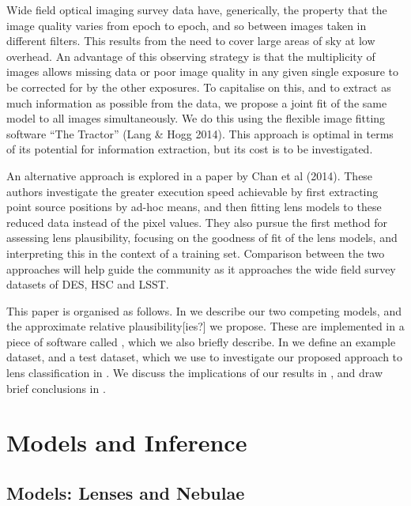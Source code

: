 \documentclass[useAMS,usenatbib]{mn2e}
\begin{document}
Wide field optical imaging survey data have, generically, the  property
that the image quality varies from epoch to epoch, and so between images
taken in different filters. This results from the need to cover large areas
of sky at low overhead. An advantage of this observing strategy is that the
multiplicity of images allows missing data or poor image quality in any
given single exposure to be corrected for by the other exposures. To
capitalise on this, and to extract as much information as possible from the
data, we propose a joint fit of the same model to all images
simultaneously. We do this using the flexible image fitting software ``The
Tractor'' (Lang \& Hogg 2014). This approach is optimal in terms of its
potential for information extraction, but its cost is to be investigated.

An alternative approach is explored in a paper by Chan et al (2014). These
authors investigate the greater execution speed achievable by first
extracting point source positions by ad-hoc means, and then fitting lens
models to these reduced data instead of the pixel values. They also pursue
the first method for assessing lens plausibility, focusing on the goodness
of fit of the lens models, and interpreting this in the context of a
training set. Comparison between the two approaches will help guide the
community as it approaches the wide field survey datasets of DES, HSC and
LSST.

This paper is organised as follows. In  we describe our two
competing models, and the approximate relative plausibility[ies?] we
propose. These are implemented in a piece of software called \LT, which we
also briefly describe. In  we define an example dataset,
and a test dataset, which we use to investigate our proposed approach to
lens classification in . We discuss the implications of
our results in , and draw brief conclusions in
.



\section{Models and Inference}
\label{sec:model}

\subsection{Models: Lenses and Nebulae}
\label{sec:model:ln}
\end{document}
